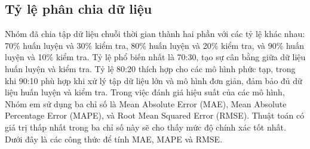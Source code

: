 \subsection{Tỷ lệ phân chia dữ liệu}
Nhóm đã chia tập dữ liệu chuỗi thời gian thành hai phần với các tỷ lệ khác nhau: 70\% huấn luyện và 30\% kiểm tra, 80\% huấn luyện và 20\% kiểm tra, và 90\% huấn luyện và 10\% kiểm tra. Tỷ lệ phổ biến nhất là 70:30, tạo sự cân bằng giữa dữ liệu huấn luyện và kiểm tra. Tỷ lệ 80:20 thích hợp cho các mô hình phức tạp, trong khi 90:10 phù hợp khi xử lý tập dữ liệu lớn và mô hình đơn giản, đảm bảo đủ dữ liệu huấn luyện và kiểm tra. Trong việc đánh giá hiệu suất của các mô hình, Nhóm em sử dụng ba chỉ số là Mean Absolute Error (MAE), Mean Absolute Percentage Error (MAPE), và Root Mean Squared Error (RMSE). Thuật toán có giá trị thấp nhất trong ba chỉ số này sẽ cho thấy mức độ chính xác tốt nhất. Dưới đây là các công thức để tính MAE, MAPE và RMSE.


